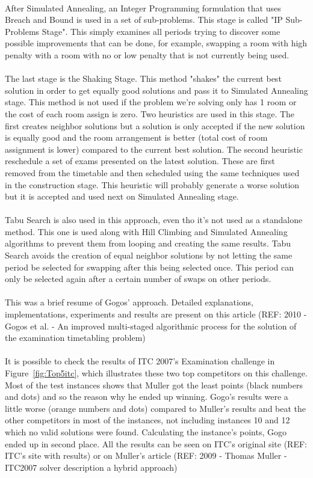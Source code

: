 \\
After Simulated Annealing, an Integer Programming formulation that uses Breach and Bound is used in a set of sub-problems. This stage is called "IP Sub-Problems Stage". This simply examines all periods trying to discover some possible improvements that can be done, for example, swapping a room with high penalty with a room with no or low penalty that is not currently being used.\\
\\
The last stage is the Shaking Stage. This method "shakes" the current best solution in order to get equally good solutions and pass it to Simulated Annealing stage. This method is not used if the problem we're solving only has 1 room or the cost of each room assign is zero. Two heuristics are used in this stage. The first creates neighbor solutions but a solution is only accepted if the new solution is equally good and the room arrangement is better (total cost of room assignment is lower) compared to the current best solution. The second heuristic reschedule a set of exams presented on the latest solution. These are first removed from the timetable and then scheduled using the same techniques used in the construction stage. This heuristic will probably generate a worse solution but it is accepted and used next on Simulated Annealing stage.\\
\\
Tabu Search is also used in this approach, even tho it's not used as a standalone method. This one is used along with Hill Climbing and Simulated Annealing algorithms to prevent them from looping and creating the same results. Tabu Search avoids the creation of equal neighbor solutions by not letting the same period be selected for swapping after this being selected once. This period can only be selected again after a certain number of swaps on other periods.\\
\\
This was a brief resume of Gogos' approach. Detailed explanations, implementations, experiments and results are present on this article (REF: 2010 - Gogos et al. - An improved multi-staged algorithmic process for the solution of the examination timetabling problem)\\
\\
It is possible to check the results of ITC 2007's Examination challenge in Figure~\ref{fig:Top5itc}, which illustrates these two top competitors on this challenge. Most of the test instances shows that Muller got the least points (black numbers and dots) and so the reason why he ended up winning. Gogo's results were a little worse (orange numbers and dots) compared to Muller's results and beat the other competitors in most of the instances, not including instances 10 and 12 which no valid solutions were found. Calculating the instance's points, Gogo ended up in second place. All the results can be seen on ITC's original site (REF: ITC's site with results) or on Muller's article (REF: 2009 - Thomas Muller - ITC2007 solver description a hybrid approach)

